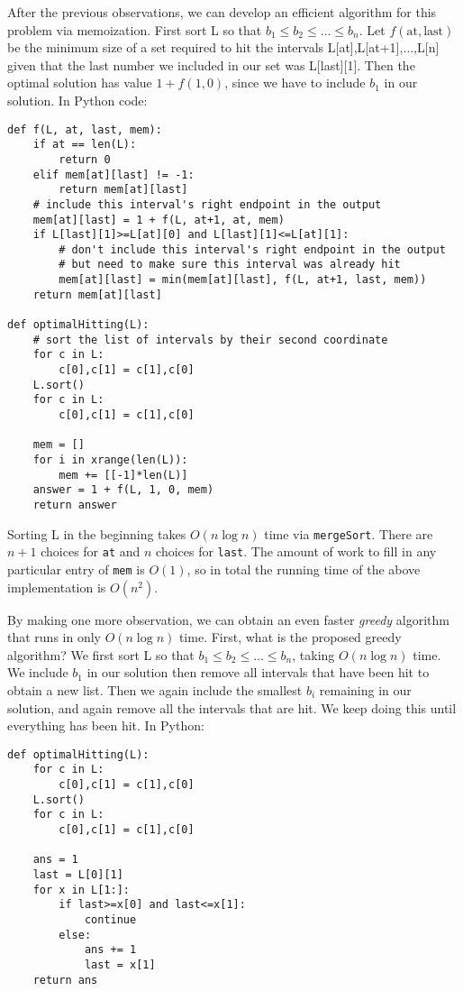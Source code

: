 \documentclass[11pt]{article}
\begin{document}
After the previous observations, we can develop an efficient algorithm
for this problem
via memoization.  First sort L so that $b_1 \le b_2
\le \ldots \le b_n$.  Let $f(\mathrm{at}, \mathrm{last})$ be the
minimum size of a set required to hit the intervals
L[at],L[at+1],$\ldots$,L[n] given that the last number we included in
our set was L[last][1].  Then the optimal solution has value $1 + f(1,
0)$, since we have to include $b_1$ in our solution.
In Python code:

\begin{verbatim}
def f(L, at, last, mem):
    if at == len(L):
        return 0
    elif mem[at][last] != -1:
        return mem[at][last]
    # include this interval's right endpoint in the output
    mem[at][last] = 1 + f(L, at+1, at, mem)
    if L[last][1]>=L[at][0] and L[last][1]<=L[at][1]:
        # don't include this interval's right endpoint in the output
        # but need to make sure this interval was already hit
        mem[at][last] = min(mem[at][last], f(L, at+1, last, mem))
    return mem[at][last]

def optimalHitting(L):
    # sort the list of intervals by their second coordinate
    for c in L:
        c[0],c[1] = c[1],c[0]
    L.sort()
    for c in L:
        c[0],c[1] = c[1],c[0]
        
    mem = []
    for i in xrange(len(L)):
        mem += [[-1]*len(L)]
    answer = 1 + f(L, 1, 0, mem)
    return answer
\end{verbatim}

Sorting L in the beginning takes $O(n\log n)$ time via
\texttt{mergeSort}.
There are $n+1$ choices for \texttt{at} and $n$ choices for
\texttt{last}.  The amount of work to fill in any particular entry of
\texttt{mem} is $O(1)$, so in total the running time of the above
implementation is $O(n^2)$.

By making one more observation, we can obtain an even faster {\em
  greedy} algorithm that runs in only $O(n\log n)$ time.  First, what
is the proposed greedy algorithm?  We first sort L so that $b_1 \le
b_2 \le \ldots \le b_n$, taking $O(n\log n)$ time.  We include $b_1$
in our solution then remove
all intervals that have been hit to obtain a new list.  Then we again
include the smallest $b_i$ remaining in our solution, and again remove
all the intervals that are hit.  We keep doing this until everything
has been hit.  In Python:

\begin{verbatim}
def optimalHitting(L):
    for c in L:
        c[0],c[1] = c[1],c[0]
    L.sort()
    for c in L:
        c[0],c[1] = c[1],c[0]

    ans = 1
    last = L[0][1]
    for x in L[1:]:
        if last>=x[0] and last<=x[1]:
            continue
        else:
            ans += 1
            last = x[1]
    return ans
\end{verbatim}
\end{document}
